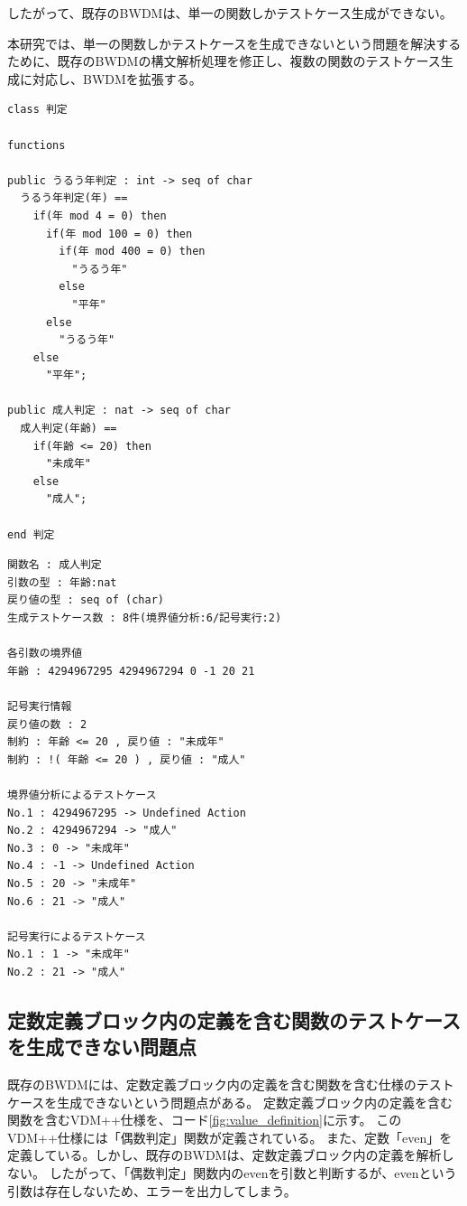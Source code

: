 \documentclass[uplatex, report, a4j, 10pt]{jsbook}
\newcommand{\tool}{BWDM}
\begin{document}
したがって、既存のBWDMは、単一の関数しかテストケース生成ができない。

本研究では、単一の関数しかテストケースを生成できないという問題を解決するために、既存の\tool{}の構文解析処理を修正し、複数の関数のテストケース生成に対応し、\tool{}を拡張する。

\lstset{language=}
\noindent\begin{minipage}{\textwidth}
  \begin{lstlisting}[caption=複数の関数を含むVDM++仕様,label=fig:func_multiple]
class 判定

functions

public うるう年判定 : int -> seq of char
  うるう年判定(年) ==
    if(年 mod 4 = 0) then
      if(年 mod 100 = 0) then
        if(年 mod 400 = 0) then
          "うるう年"
        else
          "平年"
      else
        "うるう年"
    else
      "平年";

public 成人判定 : nat -> seq of char
  成人判定(年齢) ==
    if(年齢 <= 20) then
      "未成年"
    else
      "成人";

end 判定
\end{lstlisting}
\end{minipage}

\lstset{language=}
\noindent\begin{minipage}{\textwidth}
  \begin{lstlisting}[caption=コード\ref{fig:func_multiple}のVDM++仕様を既存のBWDMに適用した際の出力,label=fig:func_multiple_result]
関数名 : 成人判定
引数の型 : 年齢:nat 
戻り値の型 : seq of (char)
生成テストケース数 : 8件(境界値分析:6/記号実行:2)

各引数の境界値
年齢 : 4294967295 4294967294 0 -1 20 21 

記号実行情報
戻り値の数 : 2
制約 : 年齢 <= 20 , 戻り値 : "未成年"
制約 : !( 年齢 <= 20 ) , 戻り値 : "成人"

境界値分析によるテストケース
No.1 : 4294967295 -> Undefined Action
No.2 : 4294967294 -> "成人"
No.3 : 0 -> "未成年"
No.4 : -1 -> Undefined Action
No.5 : 20 -> "未成年"
No.6 : 21 -> "成人"

記号実行によるテストケース
No.1 : 1 -> "未成年"
No.2 : 21 -> "成人"
\end{lstlisting}
\end{minipage}

\subsection{定数定義ブロック内の定義を含む関数のテストケースを生成できない問題点}\label{sec:probrem_value}
既存の\tool{}には、定数定義ブロック内の定義を含む関数を含む仕様のテストケースを生成できないという問題点がある。
定数定義ブロック内の定義を含む関数を含むVDM++仕様を、コード\ref{fig:value_definition}に示す。
このVDM++仕様には「偶数判定」関数が定義されている。
また、定数「even」を定義している。しかし、既存のBWDMは、定数定義ブロック内の定義を解析しない。
したがって、「偶数判定」関数内のevenを引数と判断するが、evenという引数は存在しないため、エラーを出力してしまう。
\end{document}
